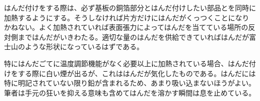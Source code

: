 \documentclass[a4paper,titlepage,here]{ujarticle}
\begin{document}
はんだ付けをする際は、必ず基板の銅箔部分とはんだ付けしたい部品とを同時に加熱するようにする。そうしなければ片方だけにはんだがくっつくことになりかねない。よく加熱されていれば表面張力によってはんだを当てている場所の反対側まではんだがいきわたる。適切な量のはんだを供給できていればはんだが富士山のような形状になっているはずである。

特にはんだごてに温度調節機能がなく必要以上に加熱されている場合、はんだ付けをする際に白い煙が出るが、これははんだが気化したものである。はんだには特に明記されていない限り鉛が含まれるため、あまり吸い込まないほうがよい。筆者は手元の狂いを抑える意味も含めてはんだを溶かす瞬間は息を止めている。
\end{document}
